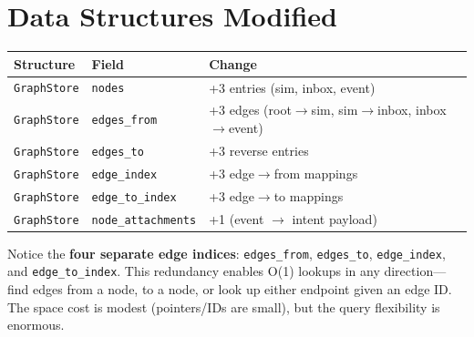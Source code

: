 \section{Data Structures Modified}

\begin{center}
\begin{tabular}{lll}
\toprule
\textbf{Structure} & \textbf{Field} & \textbf{Change} \\
\midrule
\texttt{GraphStore} & \texttt{nodes} & +3 entries (sim, inbox, event) \\
\texttt{GraphStore} & \texttt{edges\_from} & +3 edges (root$\to$sim, sim$\to$inbox, inbox$\to$event) \\
\texttt{GraphStore} & \texttt{edges\_to} & +3 reverse entries \\
\texttt{GraphStore} & \texttt{edge\_index} & +3 edge$\to$from mappings \\
\texttt{GraphStore} & \texttt{edge\_to\_index} & +3 edge$\to$to mappings \\
\texttt{GraphStore} & \texttt{node\_attachments} & +1 (event $\to$ intent payload) \\
\bottomrule
\end{tabular}
\end{center}

\begin{tourguide}
Notice the \textbf{four separate edge indices}: \texttt{edges\_from}, \texttt{edges\_to}, \texttt{edge\_index}, and \texttt{edge\_to\_index}. This redundancy enables O(1) lookups in any direction---find edges from a node, to a node, or look up either endpoint given an edge ID. The space cost is modest (pointers/IDs are small), but the query flexibility is enormous.
\end{tourguide}
